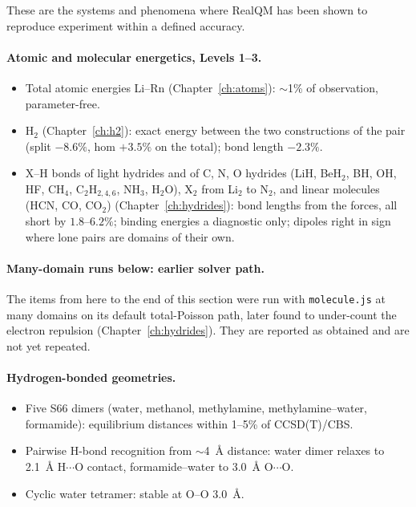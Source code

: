These are the systems and phenomena where RealQM has been shown to reproduce experiment within a defined accuracy.

\paragraph{Atomic and molecular energetics, Levels 1--3.}
\begin{itemize}
\item Total atomic energies Li--Rn (Chapter~\ref{ch:atoms}): $\sim$1\% of observation, parameter-free.
\item H$_2$ (Chapter~\ref{ch:h2}): exact energy between the two constructions of the pair (split $-8.6\%$, hom $+3.5\%$ on the total); bond length $-2.3\%$.
\item X--H bonds of light hydrides and of C, N, O hydrides (LiH, BeH$_2$, BH, OH, HF, CH$_4$, C$_2$H$_{2,4,6}$, NH$_3$, H$_2$O), X$_2$ from Li$_2$ to N$_2$, and linear molecules (HCN, CO, CO$_2$) (Chapter~\ref{ch:hydrides}): bond lengths from the forces, all short by $1.8$--$6.2\%$; binding energies a diagnostic only; dipoles right in sign where lone pairs are domains of their own.
\end{itemize}

\paragraph{Many-domain runs below: earlier solver path.} The items from here to the end of this section were run with \texttt{molecule.js} at many domains on its default total-Poisson path, later found to under-count the electron repulsion (Chapter~\ref{ch:hydrides}). They are reported as obtained and are not yet repeated.

\paragraph{Hydrogen-bonded geometries.}
\begin{itemize}
\item Five S66 dimers (water, methanol, methylamine, methylamine--water, formamide): equilibrium distances within 1--5\% of CCSD(T)/CBS.
\item Pairwise H-bond recognition from $\sim$4~\AA{} distance: water dimer relaxes to 2.1~\AA{} H$\cdots$O contact, formamide--water to 3.0~\AA{} O$\cdots$O.
\item Cyclic water tetramer: stable at O--O 3.0~\AA.
\end{itemize}

